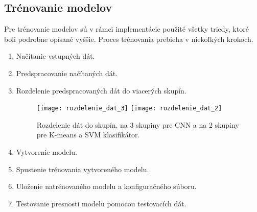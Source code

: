 \subsection{Trénovanie modelov}
\label{sec:trenovanie}
Pre trénovanie modelov sú v rámci implementácie použité všetky triedy, ktoré boli podrobne opísané vyššie.
Proces trénovania prebieha v niekoľkých krokoch.
\begin{enumerate}
    \item Načítanie vstupných dát.
    \item Predspracovanie načítaných dát.
    \item Rozdelenie predspracovaných dát do viacerých skupín.
    
    \begin{figure}[H]
        \centering
        \texttt{[image: rozdelenie\_dat\_3]}
        \quad
        \texttt{[image: rozdelenie\_dat\_2]}
        \caption{Rozdelenie dát do skupín, na 3 skupiny pre CNN a na 2 skupiny pre K-means a SVM klasifikátor.}
        \label{pic:datagroups}
    \end{figure}


    \item Vytvorenie modelu.
    \item Spustenie trénovania vytvoreného modelu.
    \item Uloženie natrénovaného modelu a konfiguračného súboru.
    \item Testovanie presnosti modelu pomocou testovacích dát.
\end{enumerate}

